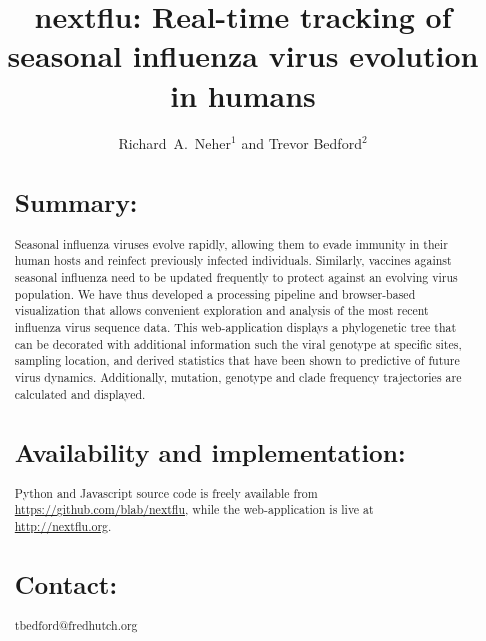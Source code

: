 \documentclass{bioinfo}
\begin{document}
\title[Tracking of seasonal influenza virus evolution]{nextflu: Real-time tracking of seasonal influenza virus evolution in humans}
\author{Richard~A.~Neher$^{1}$ and Trevor Bedford$^{2}$}
\address{$^{1}$Max Planck Institute for Developmental Biology, 72076 T\"ubingen, Germany, and $^{2}$Vaccine and Infectious Disease Division, Fred Hutchinson Cancer Research Center, Seattle, WA 98109, USA}


\maketitle



\begin{abstract} \section{Summary:} Seasonal influenza viruses evolve rapidly, allowing them to evade immunity in their human hosts and reinfect previously infected individuals.
Similarly, vaccines against seasonal influenza need to be updated frequently to protect against an evolving virus population.
We have thus developed a processing pipeline and browser-based visualization that allows convenient exploration and analysis of the most recent influenza virus sequence data.
This web-application displays a phylogenetic tree that can be decorated with additional information such the viral genotype at specific sites, sampling location, and derived statistics that have been shown to predictive of future virus dynamics.
Additionally, mutation, genotype and clade frequency trajectories are calculated and displayed.

\section{Availability and implementation:} Python and Javascript source code is freely available from \url{https://github.com/blab/nextflu}, while the web-application is live at \url{http://nextflu.org}.

\section{Contact:} tbedford@fredhutch.org

\end{abstract}
\end{document}
